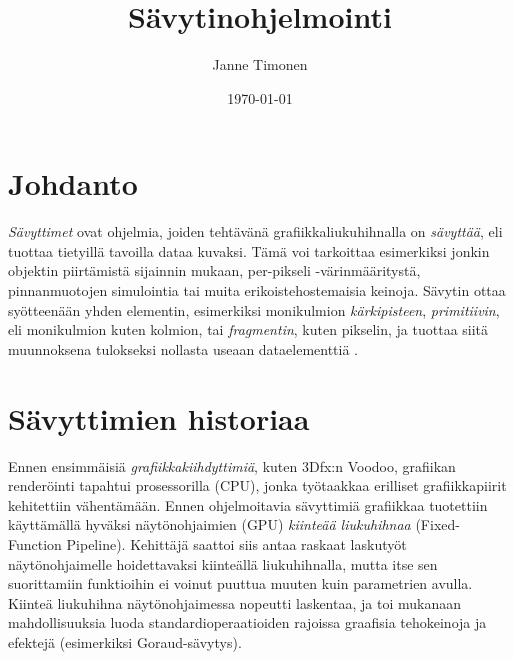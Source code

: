 \documentclass[finnish]{tktltiki2}
\title{Sävytinohjelmointi}
\author{Janne Timonen}
\date{\today}
\theoremstyle{definition}
\theoremstyle{remark}
\begin{document}

\frontmatter      %

\maketitle        %
\makeabstract     %

\tableofcontents  %


\mainmatter       %

\section{Johdanto}


\emph{Sävyttimet} ovat ohjelmia, joiden tehtävänä grafiikkaliukuhihnalla on \emph{sävyttää}, eli tuottaa tietyillä tavoilla dataa kuvaksi. Tämä voi tarkoittaa esimerkiksi jonkin objektin piirtämistä sijainnin mukaan, per-pikseli -värinmääritystä, pinnanmuotojen simulointia tai muita erikoistehostemaisia keinoja. Sävytin ottaa syötteenään yhden elementin, esimerkiksi monikulmion \emph{kärkipisteen}, \emph{primitiivin}, eli monikulmion kuten kolmion, tai \emph{fragmentin}, kuten pikselin, ja tuottaa siitä muunnoksena tulokseksi nollasta useaan dataelementtiä \cite{Gre14}. 

\section{Sävyttimien historiaa}

Ennen ensimmäisiä \emph{grafiikkakiihdyttimiä}, kuten 3Dfx:n Voodoo, grafiikan renderöinti tapahtui prosessorilla (CPU), jonka työtaakkaa erilliset grafiikkapiirit kehitettiin vähentämään. Ennen ohjelmoitavia sävyttimiä grafiikkaa tuotettiin käyttämällä hyväksi näytönohjaimien (GPU) \emph{kiinteää liukuhihnaa} (Fixed-Function Pipeline). Kehittäjä saattoi siis antaa raskaat laskutyöt näytönohjaimelle hoidettavaksi kiinteällä liukuhihnalla, mutta itse sen suorittamiin funktioihin ei voinut puuttua muuten kuin parametrien avulla. Kiinteä liukuhihna näytönohjaimessa nopeutti laskentaa, ja toi mukanaan mahdollisuuksia luoda standardioperaatioiden rajoissa graafisia tehokeinoja ja efektejä (esimerkiksi Goraud-sävytys).
\end{document}
